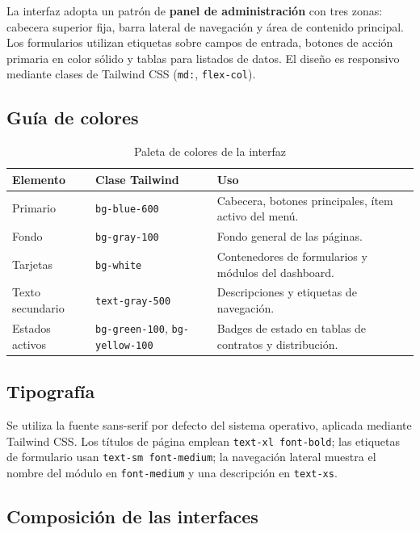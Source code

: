 \documentclass[12pt,a4paper]{report}
\begin{document}
La interfaz adopta un patrón de \textbf{panel de administración} con tres zonas: cabecera superior fija, barra lateral de navegación y área de contenido principal. Los formularios utilizan etiquetas sobre campos de entrada, botones de acción primaria en color sólido y tablas para listados de datos. El diseño es responsivo mediante clases de Tailwind CSS (\texttt{md:}, \texttt{flex-col}).

\subsection{Guía de colores}

\begin{table}[htbp]
  \centering
  \caption{Paleta de colores de la interfaz}
  \begin{tabular}{@{}p{3cm}p{3cm}p{7cm}@{}}
    \toprule
    \textbf{Elemento} & \textbf{Clase Tailwind} & \textbf{Uso} \\
    \midrule
    Primario & \texttt{bg-blue-600} & Cabecera, botones principales, ítem activo del menú. \\
    Fondo & \texttt{bg-gray-100} & Fondo general de las páginas. \\
    Tarjetas & \texttt{bg-white} & Contenedores de formularios y módulos del dashboard. \\
    Texto secundario & \texttt{text-gray-500} & Descripciones y etiquetas de navegación. \\
    Estados activos & \texttt{bg-green-100}, \texttt{bg-yellow-100} & Badges de estado en tablas de contratos y distribución. \\
    \bottomrule
  \end{tabular}
\end{table}

\subsection{Tipografía}

Se utiliza la fuente sans-serif por defecto del sistema operativo, aplicada mediante Tailwind CSS. Los títulos de página emplean \texttt{text-xl font-bold}; las etiquetas de formulario usan \texttt{text-sm font-medium}; la navegación lateral muestra el nombre del módulo en \texttt{font-medium} y una descripción en \texttt{text-xs}.

\subsection{Composición de las interfaces}
\end{document}
